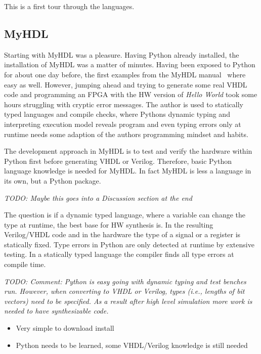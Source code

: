 \documentclass[10pt, conference, compsocconf]{IEEEtran}
\newcommand{\todo}[1]{{\emph{TODO: #1}}}
\begin{document}
This is a first tour through the languages.

\subsection{MyHDL}

Starting with MyHDL was a pleasure. Having Python already installed, the installation
of MyHDL was a matter of minutes. Having been exposed to Python for about one
day before, the first examples from the MyHDL manual~\cite{myhdl:2010} where easy as well.
However, jumping ahead and trying to generate some real VHDL code and programming
an FPGA with the HW version of \emph{Hello World} took some hours struggling
with cryptic error messages. The author is used to statically typed languages and
compile checks, where Pythons dynamic typing and interpreting execution model
reveals program and even typing errors only at runtime needs some adaption of
the authors programming mindset and habits.

The development approach in MyHDL is to test and verify the hardware within Python first
before generating VHDL or Verilog. Therefore, basic Python language knowledge is
needed for MyHDL. In fact MyHDL is less a language in its own, but a Python package.

\todo{Maybe this goes into a Discussion section at the end}

The question is if a dynamic typed language, where a variable can change the type
at runtime, the best base for HW synthesis is. In the resulting Verilog/VHDL code and
in the hardware the type of a signal or a register is statically fixed. Type errors in
Python are only detected at runtime by extensive testing. In a statically typed
language the compiler finds all type errors at compile time.

\todo{Comment: Python is easy going with dynamic typing and test benches run.
However, when converting to VHDL or Verilog, types (i.e., lengths of bit vectors)
need to be specified. As a result after high level simulation more work is needed
to have synthesizable code.}





\begin{itemize}
\item Very simple to download install
\item Python needs to be learned, some VHDL/Verilog knowledge is still needed
\end{itemize}
\end{document}
